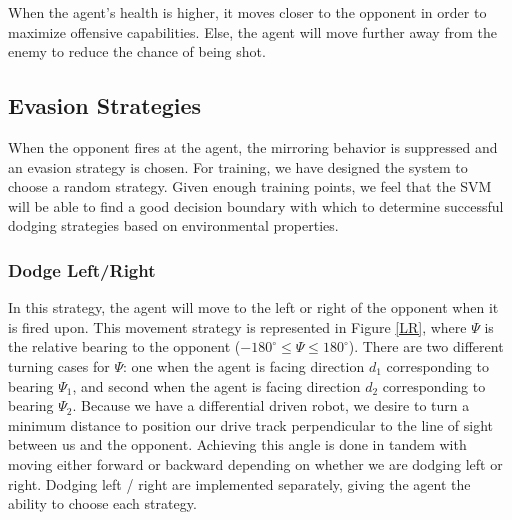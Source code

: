 \documentclass{article}
\theoremstyle{plain}
\theoremstyle{definition}
\theoremstyle{remark}
\begin{document}
When the agent's health is higher, it moves closer to the opponent in order to maximize offensive capabilities. Else, the agent will move further away from the enemy to reduce the chance of being shot.


\subsection*{Evasion Strategies}
When the opponent fires at the agent, the mirroring behavior is suppressed and an evasion strategy is chosen. For training, we have designed the system to choose a random strategy. Given enough training points, we feel that the SVM will be able to find a good decision boundary with which to determine successful dodging strategies based on environmental properties. 

\subsubsection*{Dodge Left/Right}
In this strategy, the agent will move to the left or right of the opponent when it is fired upon. This movement strategy is represented in Figure \ref{LR}, where $\Psi$ is the relative bearing to the opponent ($-180^{\circ} \leq \Psi \leq 180^{\circ}$). There are two different turning cases for $\Psi$: one when the agent is facing direction $d_1$ corresponding to bearing $\Psi_1$, and second when the agent is facing direction $d_2$ corresponding to bearing $\Psi_2$. Because we have a differential driven robot, we desire to turn a minimum distance to position our drive track perpendicular to the line of sight between us and the opponent. Achieving this angle is done in tandem with moving either forward or backward depending on whether we are dodging left or right. Dodging left / right are implemented separately, giving the agent the ability to choose each strategy.\\
\end{document}
